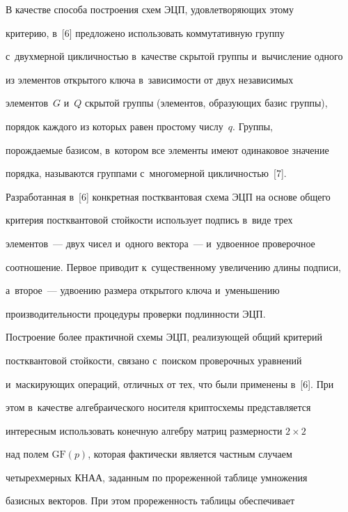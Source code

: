    


   В качестве способа построения схем ЭЦП, удовлетворяющих этому 


критерию, в~[6] предложено использовать коммутативную группу 


с~двухмерной цикличностью в~качестве скрытой группы и~вычисление одного 


из элементов открытого ключа в~за\-ви\-си\-мости от двух независимых 


элементов~$G$ и~$Q$ скрытой группы (элементов, образующих базис группы), 


порядок каждого из которых равен прос\-то\-му числу~$q$. Группы, 


порождаемые базисом, в~котором все элементы имеют одинаковое значение 


порядка, называются группами с~многомерной цикличностью~[7]. 


   


   Разработанная в~[6] конкретная постквантовая схема ЭЦП на основе общего 


критерия постквантовой стойкости использует подпись в~виде трех  


элементов~--- двух чисел и~одного вектора~--- и~удвоенное проверочное 


соотношение. Первое приводит к~существенному увеличению длины подписи, 


а~второе~--- удвоению размера открытого ключа и~уменьшению 


производительности процедуры проверки подлинности ЭЦП. 


   


   Построение более практичной схемы ЭЦП, реализующей общий критерий 


постквантовой стойкости, связано с~поиском проверочных уравнений 


и~маскирующих операций, отличных от тех, что были применены в~[6]. При 


этом в~качестве алгебраического носителя криптосхемы представляется 


интересным использовать конечную алгебру матриц размерности $2\times2$ 


над полем $\mathrm{GF}(p)$, которая фактически является част\-ным случаем 


четырехмерных КНАА, заданным по прореженной таб\-ли\-це умножения 


базисных векторов. При этом прореженность таб\-ли\-цы обеспечивает 


